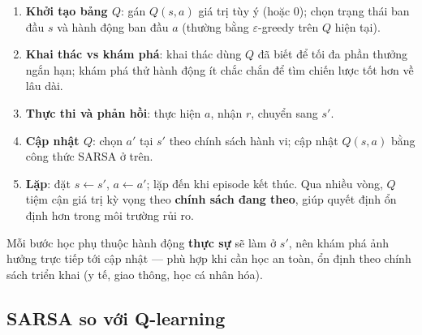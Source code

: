 \begin{phuongphap}[title={Các bước thuật toán SARSA}]
\begin{enumerate}
  \item \textbf{Khởi tạo bảng $Q$}: gán $Q(s,a)$ giá trị tùy ý (hoặc 0); chọn trạng thái ban đầu $s$ và hành động ban đầu $a$ (thường bằng $\varepsilon$-greedy trên $Q$ hiện tại).
  \item \textbf{Khai thác vs khám phá}: khai thác dùng $Q$ đã biết để tối đa phần thưởng ngắn hạn; khám phá thử hành động ít chắc chắn để tìm chiến lược tốt hơn về lâu dài.
  \item \textbf{Thực thi và phản hồi}: thực hiện $a$, nhận $r$, chuyển sang $s'$.
  \item \textbf{Cập nhật $Q$}: chọn $a'$ tại $s'$ theo chính sách hành vi; cập nhật $Q(s,a)$ bằng công thức SARSA ở trên.
  \item \textbf{Lặp}: đặt $s \leftarrow s'$, $a \leftarrow a'$; lặp đến khi episode kết thúc. Qua nhiều vòng, $Q$ tiệm cận giá trị kỳ vọng theo \textbf{chính sách đang theo}, giúp quyết định ổn định hơn trong môi trường rủi ro.
\end{enumerate}
\end{phuongphap}

\begin{tinhchat}[title={feature on-policy}]
Mỗi bước học phụ thuộc hành động \textbf{thực sự} sẽ làm ở $s'$, nên khám phá ảnh hưởng trực tiếp tới cập nhật --- phù hợp khi cần học an toàn, ổn định theo chính sách triển khai (y tế, giao thông, học cá nhân hóa).
\end{tinhchat}

\subsection{SARSA so với Q-learning}

